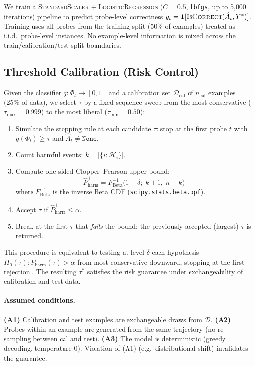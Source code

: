 \documentclass[11pt]{article}
\begin{document}
We train a \textsc{StandardScaler} $+$ \textsc{LogisticRegression}
($C{=}0.5$, \texttt{lbfgs}, up to 5{,}000 iterations) pipeline
to predict probe-level correctness $y_t = \mathbf{1}[\textsc{IsCorrect}(\hat{A}_t, Y^*)]$.
Training uses all probes from the training split (50\% of examples)
treated as i.i.d.\ probe-level instances.
No example-level information is mixed across the train/calibration/test split
boundaries.

\subsection{Threshold Calibration (Risk Control)}
\label{sec:calibration}

Given the classifier $g: \Phi_t \to [0,1]$ and a calibration set
$\mathcal{D}_{\mathrm{cal}}$ of $n_{\mathrm{cal}}$ examples (25\% of data),
we select $\tau$ by a fixed-sequence sweep from the most conservative
($\tau_{\max}=0.999$) to the most liberal ($\tau_{\min}=0.50$):

\begin{enumerate}
  \item Simulate the stopping rule at each candidate $\tau$:
        stop at the first probe $t$ with $g(\Phi_t) \ge \tau$
        and $\hat{A}_t \ne \texttt{None}$.
  \item Count harmful events: $k = |\{i : \mathcal{H}_i\}|$.
  \item Compute one-sided Clopper--Pearson upper bound:
        \[
          \widehat{P}_{\mathrm{harm}}^+ =
          F^{-1}_{\mathrm{Beta}}\!\bigl(1-\delta;\; k+1,\; n-k\bigr)
        \]
        where $F^{-1}_{\mathrm{Beta}}$ is the inverse Beta CDF
        (\texttt{scipy.stats.beta.ppf}).
  \item Accept $\tau$ if $\widehat{P}_{\mathrm{harm}}^+ \le \alpha$.
  \item Break at the first $\tau$ that \emph{fails} the bound;
        the previously accepted (largest) $\tau$ is returned.
\end{enumerate}

This procedure is equivalent to testing at level $\delta$ each
hypothesis $H_0(\tau): P_{\mathrm{harm}}(\tau) > \alpha$ from
most-conservative downward, stopping at the first rejection
\citep{angelopoulos2021learntest}.
The resulting $\tau^*$ satisfies the risk guarantee under
exchangeability of calibration and test data.

\paragraph{Assumed conditions.}
\textbf{(A1)} Calibration and test examples are exchangeable draws
from $\mathcal{D}$.  \textbf{(A2)} Probes within an example are
generated from the same trajectory (no re-sampling between cal and test).
\textbf{(A3)} The model is deterministic (greedy decoding, temperature 0).
Violation of (A1) (e.g.\ distributional shift) invalidates the guarantee.
\end{document}
